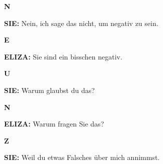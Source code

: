 \documentclass{article}
\begin{document}
\vspace{0.5cm}

\begin{minipage}[t]{0.13\textwidth}
  \centering
  {\bfseries\fontsize{14.4}{14.4}\selectfont\textcolor{pastelorange}{N}}
\end{minipage}%
\begin{minipage}[t]{0.81\textwidth}
  \textbf{SIE:} Nein, ich sage das nicht, um negativ zu sein.
\end{minipage}

\vspace{0.5cm}

\begin{minipage}[t]{0.13\textwidth}
  \centering
  {\bfseries\fontsize{14.4}{14.4}\selectfont\textcolor{pastelorange}{E}}
\end{minipage}%
\begin{minipage}[t]{0.81\textwidth}
  \textbf{ELIZA:} Sie sind ein bisschen negativ.
\end{minipage}

\vspace{0.5cm}

\begin{minipage}[t]{0.13\textwidth}
  \centering
  {\bfseries\fontsize{14.4}{14.4}\selectfont\textcolor{pastelorange}{U}}
\end{minipage}%
\begin{minipage}[t]{0.81\textwidth}
  \textbf{SIE:} Warum glaubst du das?
\end{minipage}

\vspace{0.5cm}

\begin{minipage}[t]{0.13\textwidth}
  \centering
  {\bfseries\fontsize{14.4}{14.4}\selectfont\textcolor{pastelorange}{N}}
\end{minipage}%
\begin{minipage}[t]{0.81\textwidth}
  \textbf{ELIZA:} Warum fragen Sie das?
\end{minipage}

\vspace{0.5cm}

\begin{minipage}[t]{0.13\textwidth}
  \centering
  {\bfseries\fontsize{14.4}{14.4}\selectfont\textcolor{pastelorange}{Z}}
\end{minipage}%
\begin{minipage}[t]{0.81\textwidth}
  \textbf{SIE:} Weil du etwas Falsches über mich annimmst.
\end{minipage}
\end{document}
